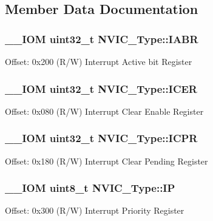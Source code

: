\subsection{Member Data Documentation}
\hypertarget{struct_n_v_i_c___type_ac803b714c8dd99a308ce9a0a2c611c56}{
\subsubsection[{I\-A\-B\-R}]{\setlength{\rightskip}{0pt plus 5cm}\-\_\-\-\_\-\-I\-O\-M uint32\-\_\-t N\-V\-I\-C\-\_\-\-Type\-::\-I\-A\-B\-R}}\label{struct_n_v_i_c___type_ac803b714c8dd99a308ce9a0a2c611c56}
Offset\-: 0x200 (R/\-W) Interrupt Active bit Register \hypertarget{struct_n_v_i_c___type_a42e4007004da61e226adb251ac73f586}{
\subsubsection[{I\-C\-E\-R}]{\setlength{\rightskip}{0pt plus 5cm}\-\_\-\-\_\-\-I\-O\-M uint32\-\_\-t N\-V\-I\-C\-\_\-\-Type\-::\-I\-C\-E\-R}}\label{struct_n_v_i_c___type_a42e4007004da61e226adb251ac73f586}
Offset\-: 0x080 (R/\-W) Interrupt Clear Enable Register \hypertarget{struct_n_v_i_c___type_acf8209acf3f339d8eb2df9d3faaa10ae}{
\subsubsection[{I\-C\-P\-R}]{\setlength{\rightskip}{0pt plus 5cm}\-\_\-\-\_\-\-I\-O\-M uint32\-\_\-t N\-V\-I\-C\-\_\-\-Type\-::\-I\-C\-P\-R}}\label{struct_n_v_i_c___type_acf8209acf3f339d8eb2df9d3faaa10ae}
Offset\-: 0x180 (R/\-W) Interrupt Clear Pending Register \hypertarget{struct_n_v_i_c___type_a4eef47929a0d1317a107f1ac62e28464}{
\subsubsection[{I\-P}]{\setlength{\rightskip}{0pt plus 5cm}\-\_\-\-\_\-\-I\-O\-M uint8\-\_\-t N\-V\-I\-C\-\_\-\-Type\-::\-I\-P}}\label{struct_n_v_i_c___type_a4eef47929a0d1317a107f1ac62e28464}
Offset\-: 0x300 (R/\-W) Interrupt Priority Register

